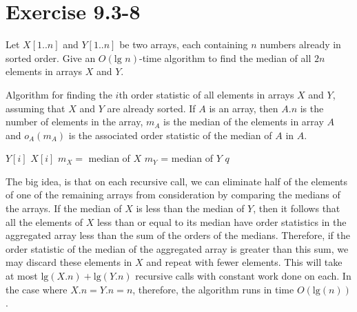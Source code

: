 \documentclass[10pt,a4paper]{article}
\begin{document}
\section*{Exercise 9.3-8}
Let $X[1..n]$ and $Y[1..n]$ be two arrays, each containing $n$ numbers already in sorted order. Give an $O(\text{lg }n)$-time algorithm to find the median of all $2n$ elements in arrays $X$ and $Y$.
\vspace*{\baselineskip}
\\
\begin{algorithm}
\caption{Algorithm for finding the $i$th order statistic of all elements in arrays $X$ and $Y$, assuming that $X$ and $Y$ are already sorted. If $A$ is an array, then $A.n$ is the number of elements in the array, $m_A$ is the median of the elements in array $A$ and $o_A(m_A)$ is the associated order statistic of the median of $A$ in $A$.}\label{word}
\begin{algorithmic}
	 \Return $Y[i]$ \EndIf
	 \Return $X[i]$ \EndIf
	\State $m_X=$ median of $X$
	\State $m_Y$ = median of $Y$
		\Else
		\EndIf
	\Else
		\Else
		\EndIf
	\EndIf
	\Return $q$
\EndFunction
\end{algorithmic}
\end{algorithm}
The big idea, is that on each recursive call, we can eliminate half of the elements of one of the remaining arrays from consideration by comparing the medians of the arrays. If the median of $X$ is less than the median of $Y$, then it follows that all the elements of $X$ less than or equal to its median have order statistics in the aggregated array less than the sum of the orders of the medians. Therefore, if the order statistic of the median of the aggregated array is greater than this sum, we may discard these elements in $X$ and repeat with fewer elements. This will take at most $\text{lg}(X.n)+\text{lg}(Y.n)$ recursive calls with constant work done on each. In the case where $X.n=Y.n=n$, therefore, the algorithm runs in time $O(\text{lg}(n))$.
\end{document}
